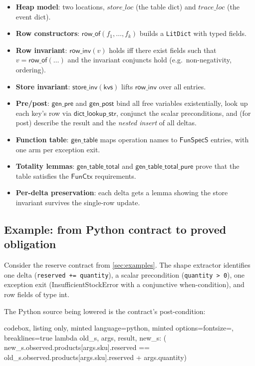 \documentclass[11pt,a4paper]{article}
\begin{document}
\begin{itemize}[nosep]
\item \textbf{Heap model}: two locations,
  $\mathit{store\_loc}$ (the table dict) and $\mathit{trace\_loc}$
  (the event dict).
\item \textbf{Row constructors}: $\mathsf{row\_of}(f_1, \dots, f_k)$
  builds a \texttt{LitDict} with typed fields.
\item \textbf{Row invariant}: $\mathsf{row\_inv}(v)$ holds iff there
  exist fields such that $v = \mathsf{row\_of}(\dots)$ and the
  invariant conjuncts hold (e.g.\ non-negativity, ordering).
\item \textbf{Store invariant}: $\mathsf{store\_inv(kvs)}$ lifts
  $\mathsf{row\_inv}$ over all entries.
\item \textbf{Pre/post}: $\mathsf{gen\_pre}$ and $\mathsf{gen\_post}$
  bind all free variables existentially, look up each key's row via
  $\mathsf{dict\_lookup\_str}$, conjunct the scalar preconditions, and
  (for post) describe the result and the \emph{nested insert} of all
  deltas.
\item \textbf{Function table}: $\mathsf{gen\_table}$ maps operation
  names to $\mathsf{FunSpecS}$ entries, with one arm per exception
  exit.
\item \textbf{Totality lemmas}: $\mathsf{gen\_table\_total}$ and
  $\mathsf{gen\_table\_total\_pure}$ prove that the table satisfies
  the $\mathsf{FunCtx}$ requirements.
\item \textbf{Per-delta preservation}: each delta gets a lemma showing
  the store invariant survives the single-row update.
\end{itemize}

\subsection{Example: from Python contract to proved obligation}

Consider the reserve contract from \cref{sec:examples}.  The shape
extractor identifies one delta (\texttt{reserved += quantity}), a
scalar precondition (\texttt{quantity > 0}), one exception exit
(InsufficientStockError with a conjunctive when-condition), and row
fields of type int.

The Python source being lowered is the contract's post-condition:

\begin{tcblisting}{codebox, listing only,
  minted language=python,
  minted options={fontsize=\small, breaklines=true}}
lambda old_s, args, result, new_s: (
    new_s.observed.products[args.sku].reserved
    == old_s.observed.products[args.sku].reserved
       + args.quantity)
\end{tcblisting}
\end{document}
